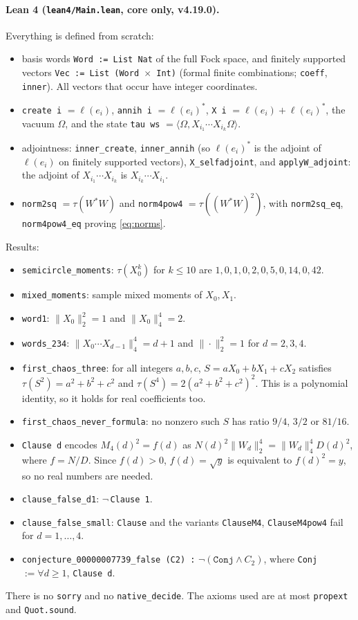 \documentclass[11pt]{article}
\theoremstyle{definition}
\theoremstyle{remark}
\newcommand{\ip}[2]{\langle #1,#2\rangle}
\begin{document}
\paragraph{Lean 4 (\texttt{lean4/Main.lean}, core only, v4.19.0).} Everything is defined from
scratch:
\begin{itemize}
\item basis words \texttt{Word := List Nat} of the full Fock space, and finitely supported
vectors \texttt{Vec := List (Word $\times$ Int)} (formal finite combinations; \texttt{coeff},
\texttt{inner}). All vectors that occur have integer coordinates.
\item \texttt{create i} $=\ell(e_i)$, \texttt{annih i} $=\ell(e_i)^*$, \texttt{X i}
$=\ell(e_i)+\ell(e_i)^*$, the vacuum \texttt{$\Omega$}, and the state
\texttt{tau ws} $=\ip{\Omega}{X_{i_1}\cdots X_{i_k}\Omega}$.
\item adjointness: \texttt{inner\_create}, \texttt{inner\_annih} (so $\ell(e_i)^*$ is the adjoint
of $\ell(e_i)$ on finitely supported vectors), \texttt{X\_selfadjoint}, and
\texttt{applyW\_adjoint}: the adjoint of $X_{i_1}\cdots X_{i_k}$ is $X_{i_k}\cdots X_{i_1}$.
\item \texttt{norm2sq} $=\tau(W^*W)$ and \texttt{norm4pow4} $=\tau((W^*W)^2)$, with
\texttt{norm2sq\_eq}, \texttt{norm4pow4\_eq} proving \eqref{eq:norms}.
\end{itemize}
Results:
\begin{itemize}
\item \texttt{semicircle\_moments}: $\tau(X_0^k)$ for $k\le10$ are $1,0,1,0,2,0,5,0,14,0,42$.
\item \texttt{mixed\_moments}: sample mixed moments of $X_0,X_1$.
\item \texttt{word1}: $\|X_0\|_2^2=1$ and $\|X_0\|_4^4=2$.
\item \texttt{words\_234}: $\|X_0\cdots X_{d-1}\|_4^4=d+1$ and $\|\cdot\|_2^2=1$ for $d=2,3,4$.
\item \texttt{first\_chaos\_three}: for all integers $a,b,c$, $S=aX_0+bX_1+cX_2$ satisfies
$\tau(S^2)=a^2+b^2+c^2$ and $\tau(S^4)=2(a^2+b^2+c^2)^2$. This is a polynomial identity, so it
holds for real coefficients too.
\item \texttt{first\_chaos\_never\_formula}: no nonzero such $S$ has ratio $9/4$, $3/2$ or
$81/16$.
\item \texttt{Clause d} encodes $M_4(d)^2=f(d)$ as $N(d)^2\|W_d\|_2^4=\|W_d\|_4^4D(d)^2$, where
$f=N/D$. Since $f(d)>0$, $f(d)=\sqrt{y}$ is equivalent to $f(d)^2=y$, so no real numbers are needed.
\item \texttt{clause\_false\_d1}: $\neg$\,\texttt{Clause 1}.
\item \texttt{clause\_false\_small}: \texttt{Clause} and the variants \texttt{ClauseM4},
\texttt{ClauseM4pow4} fail for $d=1,\dots,4$.
\item \texttt{conjecture\_00000007739\_false (C2) :} $\neg(\texttt{Conj}\wedge C_2)$, where
\texttt{Conj} $:=\forall d\ge1$, \texttt{Clause d}.
\end{itemize}
There is no \texttt{sorry} and no \texttt{native\_decide}. The axioms used are at most
\texttt{propext} and \texttt{Quot.sound}.
\end{document}
